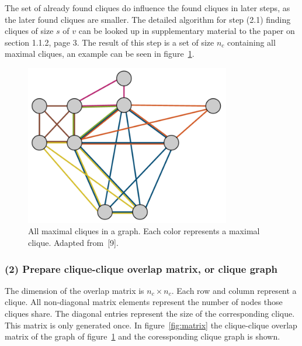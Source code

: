 \documentclass[runningheads,a4paper]{llncs}
\begin{document}
\medskip

The set of already found cliques do influence the found cliques in later steps, as the later found cliques are smaller.
The detailed algorithm for step (2.1) finding cliques of size $s$ of $v$ can be looked up in supplementary material to the paper on section 1.1.2, page 3.
The result of this step is a set of size $n_c$ containing all maximal cliques, an example can be seen in figure~\ref{fig:allmaxcliques}.

\begin{figure}
\begin{center}
	\includegraphics[width=0.8\textwidth]{img/allmaxcliques.png}
		\caption{All maximal cliques in a graph. Each color represents a maximal clique. Adapted from~[9].}
		\label{fig:allmaxcliques}
\end{center}
\end{figure}

\subsubsection{(2) Prepare clique-clique overlap matrix, or clique graph}
The dimension of the overlap matrix is $n_c \times n_c$. Each row and column represent a clique.
All non-diagonal matrix elements represent the number of nodes those cliques share.
The diagonal entries represent the size of the corresponding clique.
This matrix is only generated once.
In figure~\ref{fig:matrix} the clique-clique overlap matrix of the graph of figure~\ref{fig:allmaxcliques} and the coressponding clique graph is shown.
\end{document}
